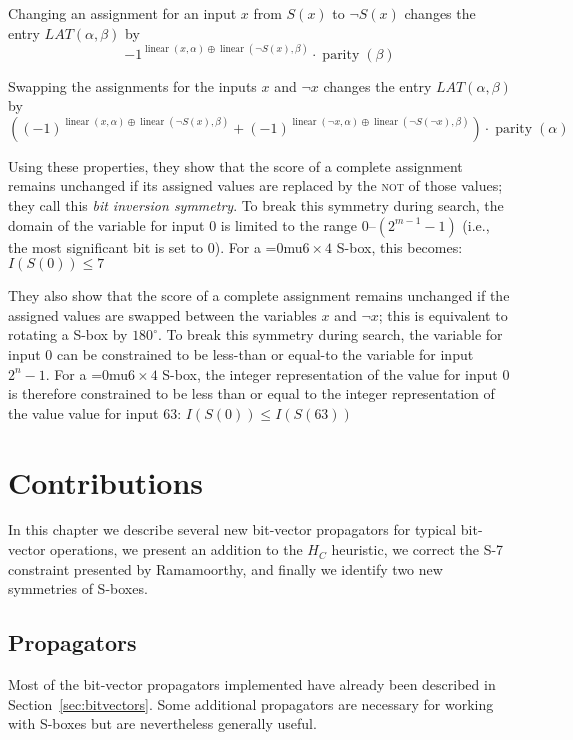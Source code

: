 \documentclass[a4paper,10pt,twoside,openright]{book}
\renewcommand{\sc}[1]{\textsc{\lowercase{#1}}}
\newcommand*\sixbyfour{\begingroup\medmuskip=0mu\relax$6 \times 4$\endgroup}
\DeclareMathOperator{\parity}{parity}
\DeclareMathOperator{\lin}{linear}
\begin{document}
Changing an assignment for an input $x$ from $S(x)$ to $\lnot S(x)$ changes the entry $\mathit{LAT}(\alpha,\beta)$ by
\[-1^{\lin(x,\alpha) \oplus \lin(\lnot S(x), \beta)} \cdot \parity(\beta) \]

Swapping the assignments for the inputs $x$ and $\lnot x$
changes the entry $\mathit{LAT}(\alpha,\beta)$ by
\[
    \left(
        (-1)^{\lin(x,\alpha) \oplus \lin(\lnot S(x), \beta)} 
        +
        (-1)^{\lin(\lnot x,\alpha) \oplus \lin(\lnot S(\lnot x), \beta)} 
    \right)
    \cdot 
    \parity(\alpha) 
\]

Using these properties, 
they show that the score of a complete assignment remains unchanged if 
its assigned values are replaced by the \sc{NOT} of those values;
they call this \textit{bit inversion symmetry}.
To break this symmetry during search, the domain of the variable for input $0$ is limited to the range $0$--$(2^{m-1}-1)$ (i.e., the most significant bit is set to $0$).
For a \sixbyfour{} S-box, this becomes: $I(S(0)) \leq 7$

They also show that the score of a complete assignment remains unchanged if 
the assigned values are swapped between the variables $x$ and $\lnot x$;
this is equivalent to rotating a S-box by $180^{\circ}$\negthinspace.
To break this symmetry during search, the variable for input $0$ 
can be constrained to be less-than or equal-to the variable for input $2^n-1$.
For a \sixbyfour{} S-box, the 
integer representation of the
value for input $0$ is therefore constrained
to be less than or equal to the 
integer representation of the value
value for input $63$: 
$I(S(0)) \leq I(S(63))$

\chapter{Contributions}
\label{sec:contributions}
In this chapter we describe several new bit-vector propagators for typical
bit-vector operations,
we present an addition to the $H_C$ heuristic,
we correct the S-7 constraint presented by Ramamoorthy,
and finally we identify two new symmetries of S-boxes.

\section{Propagators}
\label{sec:propagators}
Most of the bit-vector propagators implemented have already been described in Section~\ref{sec:bitvectors}. Some additional propagators are necessary for working with S-boxes but are nevertheless generally useful.
\end{document}
